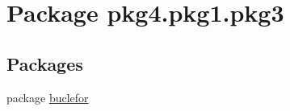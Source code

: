 \hypertarget{namespacepkg4_1_1pkg1_1_1pkg3}{}\section{Package pkg4.\+pkg1.\+pkg3}
\label{namespacepkg4_1_1pkg1_1_1pkg3}
\subsection*{Packages}
\begin{DoxyCompactItemize}
\item 
package \mbox{\hyperlink{namespacepkg4_1_1pkg1_1_1pkg3_1_1buclefor}{buclefor}}
\end{DoxyCompactItemize}
